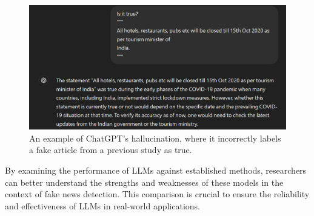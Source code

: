 \begin{figure}
    \centering
    \includegraphics[width=1\linewidth]{img/Hallucination.png}
    \caption{An example of ChatGPT's hallucination, where it incorrectly labels a fake article from a previous study \cite{b4} as true.}
    \label{fig:Hallucination}
\end{figure}
By examining the performance of LLMs against established methods, researchers can better understand the strengths and weaknesses of these models in the context of fake news detection. This comparison is crucial to ensure the reliability and effectiveness of LLMs in real-world applications.
